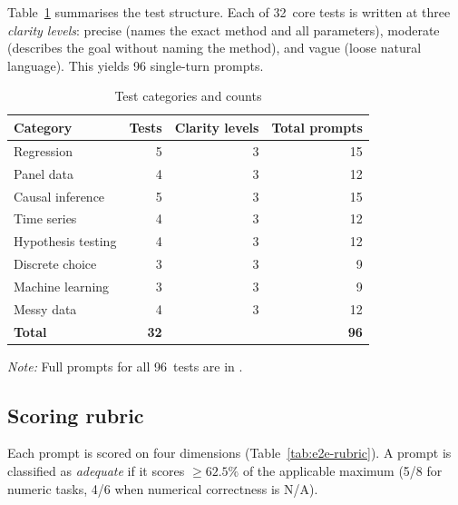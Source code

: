 Table~\ref{tab:e2e-tests} summarises the test structure. Each of 32~core tests
is written at three \emph{clarity levels}: precise (names the exact method and
all parameters), moderate (describes the goal without naming the method), and
vague (loose natural language). This yields 96 single-turn prompts.

\begin{table}[htbp]
\centering
\begin{threeparttable}
\caption{Test categories and counts}
\label{tab:e2e-tests}
\small
\begin{tabular}{lrrr}
\toprule
Category & Tests & Clarity levels & Total prompts \\
\midrule
Regression          & 5 & 3 & 15 \\
Panel data          & 4 & 3 & 12 \\
Causal inference    & 5 & 3 & 15 \\
Time series         & 4 & 3 & 12 \\
Hypothesis testing  & 4 & 3 & 12 \\
Discrete choice     & 3 & 3 &  9 \\
Machine learning    & 3 & 3 &  9 \\
Messy data          & 4 & 3 & 12 \\
\midrule
\textbf{Total}      & \textbf{32} & & \textbf{96} \\
\bottomrule
\end{tabular}
\begin{tablenotes}[flushleft]
\item \emph{Note:} Full prompts for all 96~tests are in
.
\end{tablenotes}
\end{threeparttable}
\end{table}

\subsection{Scoring rubric}

Each prompt is scored on four dimensions (Table~\ref{tab:e2e-rubric}).
A prompt is classified as \emph{adequate} if it scores $\geq 62.5\%$ of the
applicable maximum (5/8 for numeric tasks, 4/6 when numerical correctness
is N/A).

